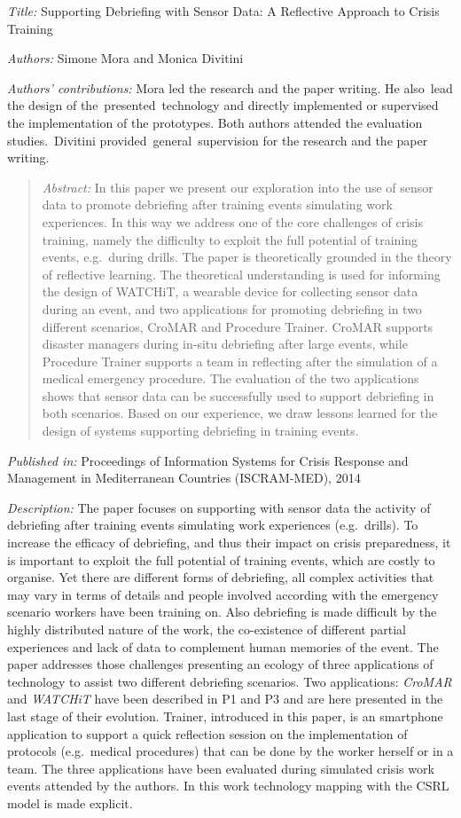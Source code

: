 \emph{Title:} Supporting Debriefing with Sensor Data: A Reflective Approach to Crisis Training

\emph{Authors:} Simone Mora and Monica Divitini

\emph{Authors' contributions:} Mora led the research and the paper writing. He also~lead the design of the~presented~technology and directly implemented or supervised the implementation of the prototypes. Both authors attended the evaluation studies.~Divitini provided~general~supervision for the research and the paper writing.
\begin{quote}
	\emph{Abstract:} In this paper we present our exploration into the use of sensor data to promote debriefing after training events simulating work experiences. In this way we address one of the core challenges of crisis training, namely the difficulty to exploit the full potential of training events, e.g.~during drills. The paper is theoretically grounded in the theory of reflective learning. The theoretical understanding is used for informing the design of WATCHiT, a wearable device for collecting sensor data during an event, and two applications for promoting debriefing in two different scenarios, CroMAR and Procedure Trainer. CroMAR supports disaster managers during in-situ debriefing after large events, while Procedure Trainer supports a team in reflecting after the simulation of a medical emergency procedure. The evaluation of the two applications shows that sensor data can be successfully used to support debriefing in both scenarios. Based on our experience, we draw lessons learned for the design of systems supporting debriefing in training events. 
\end{quote}

\emph{Published in:} Proceedings of Information Systems for Crisis Response and Management in Mediterranean Countries (ISCRAM-MED), 2014

\emph{Description:} The paper focuses on supporting with sensor data the activity of debriefing after training events simulating work experiences (e.g.~drills). To increase the efficacy of debriefing, and thus their impact on crisis preparedness, it is important to exploit the full potential of training events, which are costly to organise. Yet there are different forms of debriefing, all complex activities that may vary in terms of details and people involved according with the emergency scenario workers have been training on. Also debriefing is made difficult by the highly distributed nature of the work, the co-existence of different partial experiences and lack of data to complement human memories of the event. The paper addresses those challenges presenting an ecology of three applications of technology to assist two different debriefing scenarios. Two applications: \emph{CroMAR} and \emph{WATCHiT} have been described in P1 and P3 and are here presented in the last stage of their evolution. Trainer, introduced in this paper, is an smartphone application to support a quick reflection session on the implementation of protocols (e.g.~medical procedures) that can be done by the worker herself or in a team. The three applications have been evaluated during simulated crisis work events attended by the authors. In this work technology mapping with the CSRL model is made explicit.

